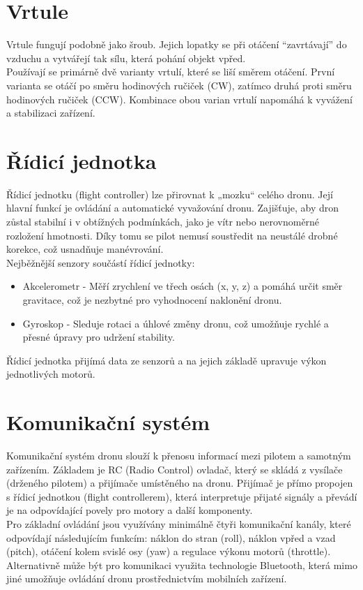 \documentclass[12pt]{report}
\begin{document}
\section[Vrtule]{Vrtule}

Vrtule fungují podobně jako šroub. Jejich lopatky se při otáčení “zavrtávají” do vzduchu a vytvářejí tak sílu, která pohání objekt vpřed.\\
Používají se primárně dvě varianty vrtulí, které se liší směrem otáčení. První varianta se otáčí po směru hodinových ručiček (CW), zatímco druhá proti směru hodinových ručiček (CCW). Kombinace obou varian vrtulí napomáhá k vyvážení a stabilizaci zařízení. \cite{mainbook} \cite{dojo}

\section[Řídicí jednotka]{Řídicí jednotka}

Řídicí jednotku (flight controller) lze přirovnat k „mozku“ celého dronu. Její hlavní funkcí je ovládání a automatické vyvažování dronu. Zajišťuje, aby dron zůstal stabilní i v obtížných podmínkách, jako je vítr nebo nerovnoměrné rozložení hmotnosti. Díky tomu se pilot nemusí soustředit na neustálé drobné korekce, což usnadňuje manévrování.\\

Nejběžnější senzory součástí řídicí jednotky:
\begin{itemize}
	\item Akcelerometr -  Měří zrychlení ve třech osách (x, y, z) a pomáhá určit směr gravitace, což je nezbytné pro vyhodnocení naklonění dronu.
	\item Gyroskop - Sleduje rotaci a úhlové změny dronu, což umožňuje rychlé a přesné úpravy pro udržení stability.
\end{itemize}

Řídicí jednotka přijímá data ze senzorů a na jejich základě upravuje výkon jednotlivých motorů. \cite{mainbook}

\section[Komunikační systém]{Komunikační systém}
Komunikační systém dronu slouží k přenosu informací mezi pilotem a samotným zařízením. Základem je RC (Radio Control) ovladač, který se skládá z vysílače (drženého pilotem) a přijímače umístěného na dronu. Přijímač je přímo propojen s řídicí jednotkou (flight controllerem), která interpretuje přijaté signály a převádí je na odpovídající povely pro motory a další komponenty.\\
Pro základní ovládání jsou využívány minimálně čtyři komunikační kanály, které odpovídají následujícím funkcím: náklon do stran (roll), náklon vpřed a vzad (pitch), otáčení kolem svislé osy (yaw) a regulace výkonu motorů (throttle). Alternativně může být pro komunikaci využita technologie Bluetooth, která mimo jiné umožňuje ovládání dronu prostřednictvím mobilních zařízení.
\end{document}
